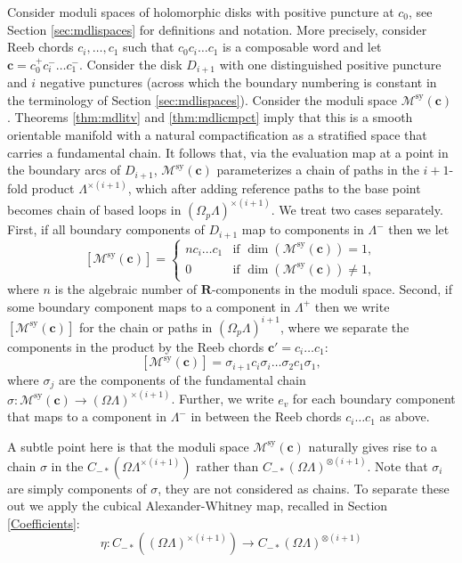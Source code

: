 \documentclass{gtpart}
\renewcommand{\R}{\mathbf{R}}
\newcommand{\sy}{\mathrm{sy}}
\begin{document}
Consider moduli spaces of holomorphic disks with positive puncture at $c_{0}$, see Section
\ref{sec:mdlispaces} for definitions and notation. More precisely, consider Reeb chords $c_i, \ldots, c_1$ such that $c_{0}c_{i}\dots c_{1}$ is a composable word and let $\mathbf{c}=c_{0}^{+}c_{i}^{-}\dots c_{1}^{-}$. 
Consider the disk $D_{i+1}$ with one distinguished positive puncture and $i$ negative punctures (across which the boundary numbering is constant in the terminology of Section \ref{sec:mdlispaces}). Consider the moduli space $\mathcal{M}^{\sy}(\mathbf{c})$. Theorems
\ref{thm:mdlitv} and \ref{thm:mdlicmpct} imply that this is a smooth orientable manifold with a natural compactification as a stratified space that carries a fundamental chain. It follows that, via the evaluation map at a point in the
boundary arcs of $D_{i+1}$, $\mathcal{M}^{\sy}(\mathbf{c})$ parameterizes a chain of paths in the
$i+1$-fold product $\Lambda^{\times(i+1)}$,
which after adding reference paths to the base point becomes chain of based loops in
$(\Omega_{p}\Lambda)^{\times (i+1)}$. We treat two cases separately. First, if all boundary components of $D_{i+1}$ map to components in $\Lambda^{-}$ then we let
\begin{equation}\label{eq:only-} 
[\mathcal{M}^{\sy}(\mathbf{c})]=
\begin{cases}
n c_{i}\dots c_{1} &\text{if } \dim(\mathcal{M}^{\sy}(\mathbf{c}))=1,\\
0 &\text{if } \dim(\mathcal{M}^{\sy}(\mathbf{c}))\ne 1,
\end{cases}
\end{equation}
where $n$ is the algebraic number of $\R$-components in the moduli space. 
Second, if some boundary component maps to a component in $\Lambda^{+}$ then
we write $[\mathcal{M}^{\sy}(\mathbf{c})]$ for the chain or paths in $(\Omega_{p}\Lambda)^{i+1}$, where we separate the components in the product by the Reeb chords $\mathbf{c}'=c_{i}\dots c_{1}$:
\[ 
[\mathcal{M}^{\sy}(\mathbf{c})]=\sigma_{i+1}c_{i}\sigma_{i}\dots \sigma_{2}c_{1}\sigma_{1},
\]
where $\sigma_{j}$ are the components of the fundamental chain $\sigma\colon
\mathcal{M}^{\sy}(\mathbf{c})\to(\Omega\Lambda)^{\times (i+1)}$. Further, we write $e_{v}$ for each boundary component that maps to a
component in $\Lambda^{-}$ in between the Reeb chords $c_{i}\dots c_{1}$ as above. 

A subtle point here is that the moduli space $\mathcal{M}^{\sy}(\mathbf{c})$ naturally gives rise to
a chain $\sigma$ in the $C_{-*}( \Omega \Lambda^{\times(i+1)})$ rather than $C_{-*}(\Omega
\Lambda)^{\otimes (i+1)}$. Note that $\sigma_i$
are simply components of $\sigma$, they are not considered as chains. To separate these out we apply the
cubical Alexander-Whitney map, recalled in Section \ref{Coefficients}:
\[ \eta : C_{-*}((\Omega \Lambda)^{\times (i+1)}) \to C_{-*}(\Omega
\Lambda)^{\otimes
(i+1) } \]
\end{document}
